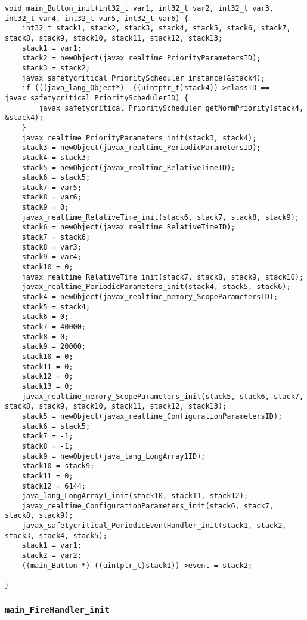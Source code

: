 \begin{landscape}
\begin{multicols}{2}
\begin{lstlisting}[firstnumber=2208]
void main_Button_init(int32_t var1, int32_t var2, int32_t var3, int32_t var4, int32_t var5, int32_t var6) {
	int32_t stack1, stack2, stack3, stack4, stack5, stack6, stack7, stack8, stack9, stack10, stack11, stack12, stack13;
	stack1 = var1;
	stack2 = newObject(javax_realtime_PriorityParametersID);
	stack3 = stack2;
	javax_safetycritical_PriorityScheduler_instance(&stack4);
	if (((java_lang_Object*)  ((uintptr_t)stack4))->classID == javax_safetycritical_PrioritySchedulerID) {
		javax_safetycritical_PriorityScheduler_getNormPriority(stack4, &stack4);
	}
	javax_realtime_PriorityParameters_init(stack3, stack4);
	stack3 = newObject(javax_realtime_PeriodicParametersID);
	stack4 = stack3;
	stack5 = newObject(javax_realtime_RelativeTimeID);
	stack6 = stack5;
	stack7 = var5;
	stack8 = var6;
	stack9 = 0;
	javax_realtime_RelativeTime_init(stack6, stack7, stack8, stack9);
	stack6 = newObject(javax_realtime_RelativeTimeID);
	stack7 = stack6;
	stack8 = var3;
	stack9 = var4;
	stack10 = 0;
	javax_realtime_RelativeTime_init(stack7, stack8, stack9, stack10);
	javax_realtime_PeriodicParameters_init(stack4, stack5, stack6);
	stack4 = newObject(javax_realtime_memory_ScopeParametersID);
	stack5 = stack4;
	stack6 = 0;
	stack7 = 40000;
	stack8 = 0;
	stack9 = 20000;
	stack10 = 0;
	stack11 = 0;
	stack12 = 0;
	stack13 = 0;
	javax_realtime_memory_ScopeParameters_init(stack5, stack6, stack7, stack8, stack9, stack10, stack11, stack12, stack13);
	stack5 = newObject(javax_realtime_ConfigurationParametersID);
	stack6 = stack5;
	stack7 = -1;
	stack8 = -1;
	stack9 = newObject(java_lang_LongArray1ID);
	stack10 = stack9;
	stack11 = 0;
	stack12 = 6144;
	java_lang_LongArray1_init(stack10, stack11, stack12);
	javax_realtime_ConfigurationParameters_init(stack6, stack7, stack8, stack9);
	javax_safetycritical_PeriodicEventHandler_init(stack1, stack2, stack3, stack4, stack5);
	stack1 = var1;
	stack2 = var2;
	((main_Button *) ((uintptr_t)stack1))->event = stack2;

}
\end{lstlisting}

\subsubsection{\texttt{main\_FireHandler\_init}}


\end{multicols}
\end{landscape}
